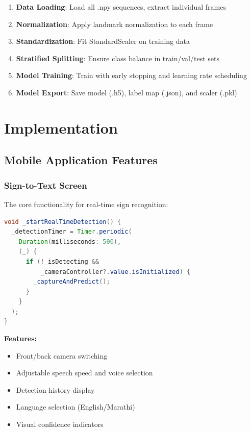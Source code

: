 \documentclass[conference]{IEEEtran}
\begin{document}
\begin{enumerate}
    \item \textbf{Data Loading}: Load all .npy sequences, extract individual frames
    \item \textbf{Normalization}: Apply landmark normalization to each frame
    \item \textbf{Standardization}: Fit StandardScaler on training data
    \item \textbf{Stratified Splitting}: Ensure class balance in train/val/test sets
    \item \textbf{Model Training}: Train with early stopping and learning rate scheduling
    \item \textbf{Model Export}: Save model (.h5), label map (.json), and scaler (.pkl)
\end{enumerate}

\section{Implementation}

\subsection{Mobile Application Features}

\subsubsection{Sign-to-Text Screen}

The core functionality for real-time sign recognition:

\begin{lstlisting}[language=Java, caption={Real-time Detection (Dart/Flutter)}]
void _startRealTimeDetection() {
  _detectionTimer = Timer.periodic(
    Duration(milliseconds: 500), 
    (_) {
      if (!_isDetecting && 
          _cameraController?.value.isInitialized) {
        _captureAndPredict();
      }
    }
  );
}
\end{lstlisting}

\textbf{Features:}
\begin{itemize}
    \item Front/back camera switching
    \item Adjustable speech speed and voice selection
    \item Detection history display
    \item Language selection (English/Marathi)
    \item Visual confidence indicators
\end{itemize}
\end{document}
